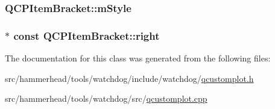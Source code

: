 \subsubsection[{\texorpdfstring{m\+Style}{mStyle}}]{ Q\+C\+P\+Item\+Bracket\+::m\+Style\hspace{0.3cm}{\ttfamily [protected]}}\hypertarget{classQCPItemBracket_ac911907184c824d621f274f8e0990080}{}\label{classQCPItemBracket_ac911907184c824d621f274f8e0990080}
\subsubsection[{\texorpdfstring{right}{right}}]{$\ast$ const Q\+C\+P\+Item\+Bracket\+::right}\hypertarget{classQCPItemBracket_afa6c1360b05a50c4e0df37b3cebab6be}{}\label{classQCPItemBracket_afa6c1360b05a50c4e0df37b3cebab6be}


The documentation for this class was generated from the following files\+:\begin{DoxyCompactItemize}
\item 
src/hammerhead/tools/watchdog/include/watchdog/\hyperlink{qcustomplot_8h}{qcustomplot.\+h}\item 
src/hammerhead/tools/watchdog/src/\hyperlink{qcustomplot_8cpp}{qcustomplot.\+cpp}\end{DoxyCompactItemize}

